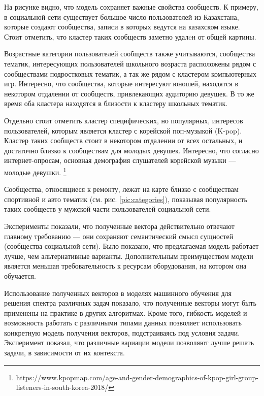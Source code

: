 \documentclass[times,specification,annotation]{itmo-student-thesis}
\begin{document}
На рисунке видно, что модель сохраняет важные свойства сообществ. К примеру, в социальной сети существует большое число пользователей из Казахстана, которые создают сообщества, записи в которых ведутся на казахском языке. Стоит отметить, что кластер таких сообществ заметно удалeн от общей картины. 

Возрастные категории пользователей сообществ также учитываются, сообщества тематик, интересующих пользователей школьного возраста расположены рядом с сообществами подростковых тематик, а так же рядом с кластером компьютерных игр. Интересно, что сообщества, которые интересуют юношей, находятся в некотором отдалении от сообществ, привлекающих аудиторию девушек. В то же время оба кластера находятся в близости к кластеру школьных тематик.

Отдельно стоит отметить кластер специфических, но популярных, интересов пользователей, которым является кластер с корейской поп-музыкой (K-pop). Кластер таких сообществ стоит в некотором отдалении от всех остальных, и достаточно близко к сообществам для молодых девушек. Интересно, что согласно интернет-опросам, основная демография слушателей корейской музыки --- молодые девушки. \footnote{https://www.kpopmap.com/age-and-gender-demographics-of-kpop-girl-group-listeners-in-south-korea-2018/}

Сообщества, относящиеся к ремонту, лежат на карте близко с сообществам спортивной и авто тематик (см. рис. \ref{pic:categories}), показывая популярность таких сообществ у мужской части пользователей социальной сети.    

\chapterconclusion

Эксперименты показали, что полученные вектора действительно отвечают главному требованию --- они сохраняют семантический смысл сущностей (сообщества социальной сети). Было показано, что предлагаемая модель работает лучше, чем альтернативные варианты. Дополнительным преимуществом модели является меньшая требовательность к ресурсам оборудования, на котором она обучается. 

Использование полученных векторов в моделях машинного обучения для решения спектра различных задач показало, что полученные векторы могут быть применены на практике в других алгоритмах. Кроме того, гибкость моделей и возможность работать с различными типами данных позволяет использовать конкретную модель получения векторов, подстраиваясь под условия задачи. Эксперимент показал, что различные вариации модели позволяют лучше решать задачи, в зависимости от их контекста. 
\end{document}
